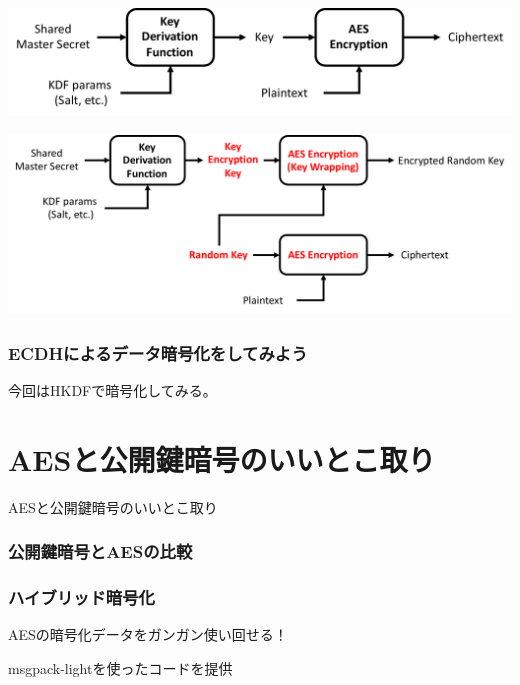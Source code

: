 \documentclass[12pt,dvipdfmx]{beamer}
\begin{document}
\begin{frame}
\begin{center}
\includegraphics[width=\linewidth]{Figs/ecdh02.pdf}
\end{center}
\end{frame}


\begin{frame}
\begin{center}
\includegraphics[width=\linewidth]{Figs/aeskw.pdf}
\end{center}
\end{frame}

\begin{frame}
\frametitle{ECDHによるデータ暗号化をしてみよう}
今回はHKDFで暗号化してみる。
\end{frame}

\section{AESと公開鍵暗号のいいとこ取り}
\begin{frame}
\centering
{\Large AESと公開鍵暗号のいいとこ取り}
\end{frame}

\begin{frame}
\frametitle{公開鍵暗号とAESの比較}
\end{frame}

\begin{frame}
\frametitle{ハイブリッド暗号化}
AESの暗号化データをガンガン使い回せる！

msgpack-lightを使ったコードを提供
\end{frame}
\end{document}

